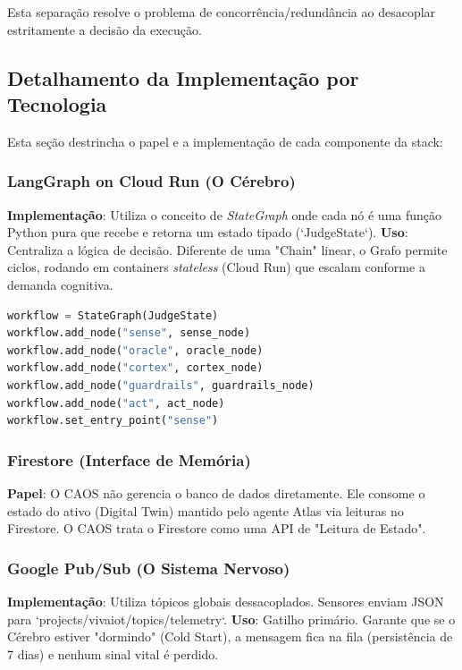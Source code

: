 \documentclass[12pt, a4paper]{article}
\begin{document}
Esta separação resolve o problema de concorrência/redundância ao desacoplar estritamente a decisão da execução.
\subsection{Detalhamento da Implementação por Tecnologia}

Esta seção destrincha o papel e a implementação de cada componente da stack:

\subsubsection{LangGraph on Cloud Run (O Cérebro)}
\textbf{Implementação}: Utiliza o conceito de \textit{StateGraph} onde cada nó é uma função Python pura que recebe e retorna um estado tipado (`JudgeState`).
\textbf{Uso}: Centraliza a lógica de decisão. Diferente de uma "Chain" linear, o Grafo permite ciclos, rodando em containers \textit{stateless} (Cloud Run) que escalam conforme a demanda cognitiva.
\begin{lstlisting}[language=Python, basicstyle=\tiny\ttfamily]
workflow = StateGraph(JudgeState)
workflow.add_node("sense", sense_node)
workflow.add_node("oracle", oracle_node)
workflow.add_node("cortex", cortex_node)
workflow.add_node("guardrails", guardrails_node)
workflow.add_node("act", act_node)
workflow.set_entry_point("sense")
\end{lstlisting}

\subsubsection{Firestore (Interface de Memória)}
\textbf{Papel}: O CAOS não gerencia o banco de dados diretamente. Ele consome o estado do ativo (Digital Twin) mantido pelo agente Atlas via leituras no Firestore. O CAOS trata o Firestore como uma API de "Leitura de Estado".

\subsubsection{Google Pub/Sub (O Sistema Nervoso)}
\textbf{Implementação}: Utiliza tópicos globais dessacoplados. Sensores enviam JSON para `projects/vivaiot/topics/telemetry`.
\textbf{Uso}: Gatilho primário. Garante que se o Cérebro estiver "dormindo" (Cold Start), a mensagem fica na fila (persistência de 7 dias) e nenhum sinal vital é perdido.
\end{document}
